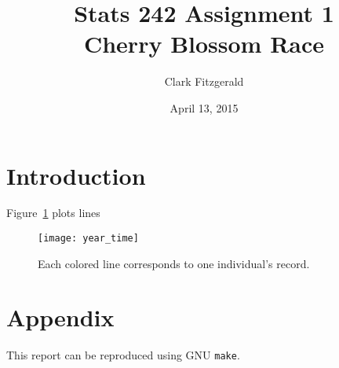 \documentclass[12pt]{article}
\begin{document}
\title{Stats 242 Assignment 1
    \\ Cherry Blossom Race}
\date{April 13, 2015}
\author{Clark Fitzgerald}
\maketitle

\newpage

\section{Introduction}

Figure~\ref{fig:year_time} plots lines 

\begin{figure}
    \centering
    \texttt{[image: year\_time]}
    \caption{Each colored line corresponds to one individual's record.}
    \label{fig:year_time}
\end{figure}


\newpage

\section{Appendix}

This report can be reproduced using GNU \texttt{make}.




\end{document}

